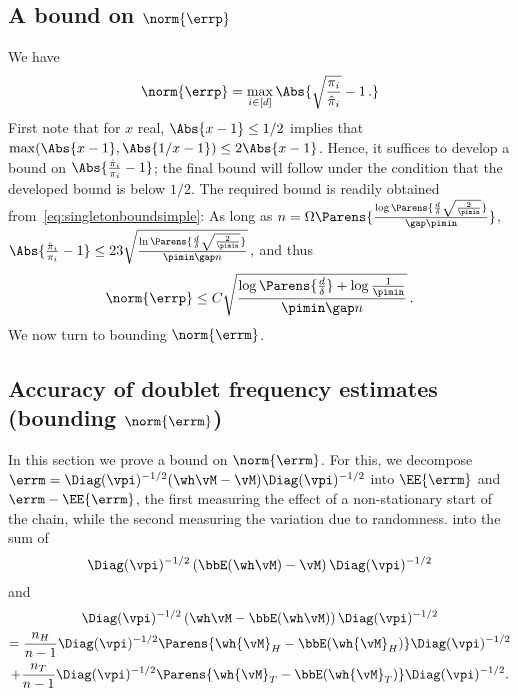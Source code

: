 \subsection{A bound on $\norm{\errp}$}
We have
\begin{align*}
  \norm{\errp}
  = \max_{i\in[d]} \Abs{
    \sqrt{\frac{\pi_i}{\hat\pi_i}} - 1\,.
  }
\end{align*}
First note that for $x$ real, $\Abs{x-1}\le 1/2$ implies that $\max(\Abs{x-1},\Abs{1/x-1}) \le 2 \Abs{x-1}$.
Hence, it suffices to develop a bound on $ \Abs{ \frac{\hat\pi_i}{\pi_i} - 1 }$;
the final bound will follow under the condition that the developed bound is below $1/2$.
The required bound is readily obtained from~\eqref{eq:singletonboundsimple}:
As long as $n = \Omega \Parens{
	\frac{\log\Parens{\frac{d}\delta\sqrt{\frac{2}{\pimin}}}
           }{\gap \pimin} }$, 
$
\Abs{\frac{\hat{\pi}_i}{\pi_i}-1}
\le
23 \sqrt{  
	\frac{\ln\Parens{\frac{d}\delta\sqrt{\frac{2}{\pimin}}}
           }{\pimin\gap n}
       }\,,
$
and thus
\begin{align}
\label{eq:singletonbound}
\norm{\errp} \le C \sqrt{ \frac{\log\Parens{\frac{d}\delta} + \log \frac{1}{\pimin} }{\pimin\gap n}} \,.
\end{align}
We now turn to bounding  $\norm{\errm}$.


\subsection{Accuracy of doublet frequency estimates (bounding $\norm{\errm}$)}
\label{sec:pairwise}
In this section we prove a bound on $\norm{\errm}$.
For this, we decompose
$\errm = \Diag(\vpi)^{-1/2}(\wh\vM-\vM)\Diag(\vpi)^{-1/2} $
into $\EE{\errm}$ and 
$
\errm-\EE{\errm}%
$, the first measuring the effect of a non-stationary start of the chain,
while the second measuring the variation due to randomness.
into the sum of
\[
  \Diag(\vpi)^{-1/2}
  \left(\bbE( \wh\vM )- \vM\right)
  \Diag(\vpi)^{-1/2}
\]
and
\begin{multline*}
  \Diag(\vpi)^{-1/2} \left(\wh\vM- \bbE(\wh\vM)\right) \Diag(\vpi)^{-1/2}
  \\
  =
  \frac{n_H}{n-1}
  \Diag(\vpi)^{-1/2}\Parens{
    \wh{\vM}_H - \bbE(\wh{\vM}_H)
  }\Diag(\vpi)^{-1/2}
  \\
  + \frac{n_T}{n-1}
  \Diag(\vpi)^{-1/2}\Parens{
    \wh{\vM}_T - \bbE(\wh{\vM}_T)
  }\Diag(\vpi)^{-1/2}
  .
\end{multline*}
\fi
